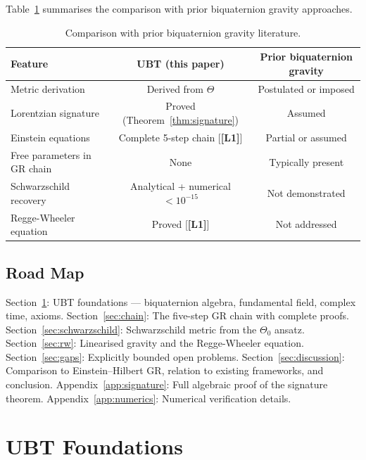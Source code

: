 \documentclass[12pt,a4paper]{article}
\theoremstyle{definition}
\theoremstyle{remark}
\newcommand{\Lone}{\textbf{[L1]}}
\begin{document}
Table~\ref{tab:novelty} summarises the comparison with prior biquaternion
gravity approaches.

\begin{table}[ht]
\centering
\caption{Comparison with prior biquaternion gravity literature.}
\label{tab:novelty}
\begin{tabular}{lcc}
\toprule
\textbf{Feature} & \textbf{UBT (this paper)} & \textbf{Prior biquaternion gravity} \\
\midrule
Metric derivation & Derived from $\Theta$ & Postulated or imposed \\
Lorentzian signature & Proved (Theorem~\ref{thm:signature}) & Assumed \\
Einstein equations & Complete 5-step chain [\Lone] & Partial or assumed \\
Free parameters in GR chain & None & Typically present \\
Schwarzschild recovery & Analytical + numerical $<10^{-15}$ & Not demonstrated \\
Regge-Wheeler equation & Proved [\Lone] & Not addressed \\
\bottomrule
\end{tabular}
\end{table}

\subsection{Road Map}

Section~\ref{sec:foundations}: UBT foundations — biquaternion algebra,
fundamental field, complex time, axioms.
Section~\ref{sec:chain}: The five-step GR chain with complete proofs.
Section~\ref{sec:schwarzschild}: Schwarzschild metric from the $\Theta_0$ ansatz.
Section~\ref{sec:rw}: Linearised gravity and the Regge-Wheeler equation.
Section~\ref{sec:gaps}: Explicitly bounded open problems.
Section~\ref{sec:discussion}: Comparison to Einstein--Hilbert GR, relation
to existing frameworks, and conclusion.
Appendix~\ref{app:signature}: Full algebraic proof of the signature theorem.
Appendix~\ref{app:numerics}: Numerical verification details.

\section{UBT Foundations}
\label{sec:foundations}
\end{document}
